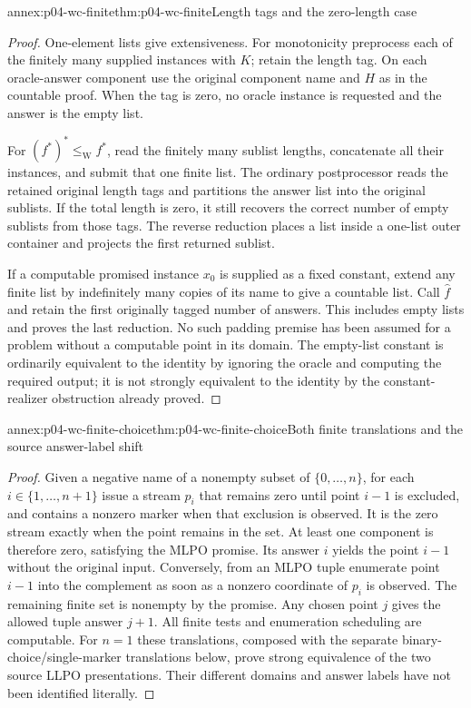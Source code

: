 \begin{annexitem}{annex:p04-wc-finite}{thm:p04-wc-finite}{Length tags and the zero-length case}
\begin{proof}
One-element lists give extensiveness. For monotonicity preprocess each
of the finitely many supplied instances with \(K\); retain the length
tag. On each oracle-answer component use the original component name
and \(H\) as in the countable proof. When the tag is zero, no oracle
instance is requested and the answer is the empty list.

For \((f^*)^*\leq_{\mathrm W} f^*\), read the finitely many sublist lengths,
concatenate all their instances, and submit that one finite list.
The ordinary postprocessor reads the retained original length tags and
partitions the answer list into the original sublists. If the total
length is zero, it still recovers the correct number of empty sublists
from those tags. The reverse reduction places a list inside a one-list
outer container and projects the first returned sublist.

If a computable promised instance \(x_0\) is supplied as a fixed
constant, extend any finite list by indefinitely many copies of its name
to give a countable list. Call \(\widehat f\) and retain the first
originally tagged number of answers. This includes empty lists and
proves the last reduction. No such padding premise has been assumed
for a problem without a computable point in its domain. The empty-list
constant is ordinarily equivalent to the identity by ignoring the
oracle and computing the required output; it is not strongly equivalent
to the identity by the constant-realizer obstruction already proved.
\end{proof}
\end{annexitem}

\begin{annexitem}{annex:p04-wc-finite-choice}{thm:p04-wc-finite-choice}{Both finite translations and the source answer-label shift}
\begin{proof}
Given a negative name of a nonempty subset of \(\{0,\ldots,n\}\),
for each \(i\in\{1,\ldots,n+1\}\) issue a stream \(p_i\)
that remains zero until point \(i-1\) is excluded, and contains
a nonzero marker when that exclusion is observed. It is the zero
stream exactly when the point remains in the set. At least one
component is therefore zero, satisfying the MLPO promise. Its
answer \(i\) yields the point \(i-1\) without the original input.
Conversely, from an MLPO tuple enumerate point \(i-1\) into the
complement as soon as a nonzero coordinate of \(p_i\) is observed.
The remaining finite set is nonempty by the promise. Any chosen
point \(j\) gives the allowed tuple answer \(j+1\).
All finite tests and enumeration scheduling are computable.
For \(n=1\) these translations, composed with the separate
binary-choice/single-marker translations below, prove strong
equivalence of the two source LLPO presentations. Their different
domains and answer labels have not been identified literally.
\end{proof}
\end{annexitem}

